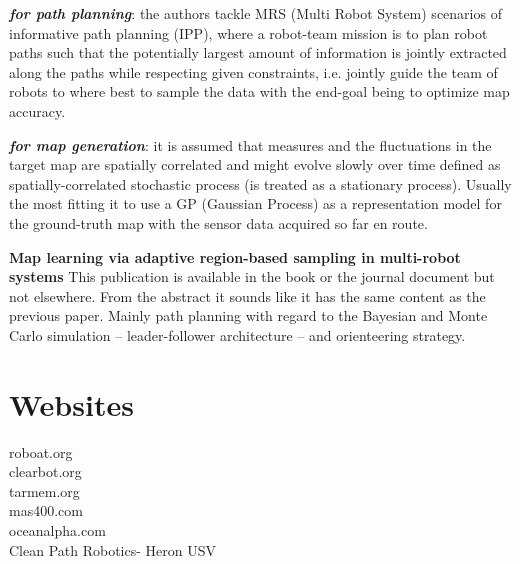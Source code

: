 \documentclass{article}
\begin{document}
\textbf{\textit{for path planning}}: the authors tackle MRS (Multi Robot System) scenarios of informative path
planning (IPP), where a robot-team mission is to plan robot paths such that the potentially largest amount of information is jointly extracted along the paths while respecting given constraints, i.e. jointly guide the team of robots to where best to sample the data with the end-goal being to optimize map accuracy.
\vspace{5pt}

\textbf{\textit{for map generation}}:
it is assumed that measures and the fluctuations in the target map are spatially correlated and might evolve slowly over time defined as spatially-correlated stochastic process (is treated as a stationary process). Usually the most fitting it to use a GP (Gaussian Process) as a representation model for the ground-truth map with the sensor data acquired so far en route. 

\vspace{5pt}

\textbf{Map learning via adaptive region-based sampling in multi-robot systems}
This publication is available in the book or the journal document but not elsewhere. From the abstract it sounds like it has the same content as the previous paper. Mainly path planning with regard to the Bayesian and Monte Carlo simulation -- leader-follower architecture -- and orienteering strategy. 
 



\section{Websites}

roboat.org \\
clearbot.org \\
tarmem.org \\
mas400.com \\
oceanalpha.com \\
Clean Path Robotics- Heron USV
\end{document}

